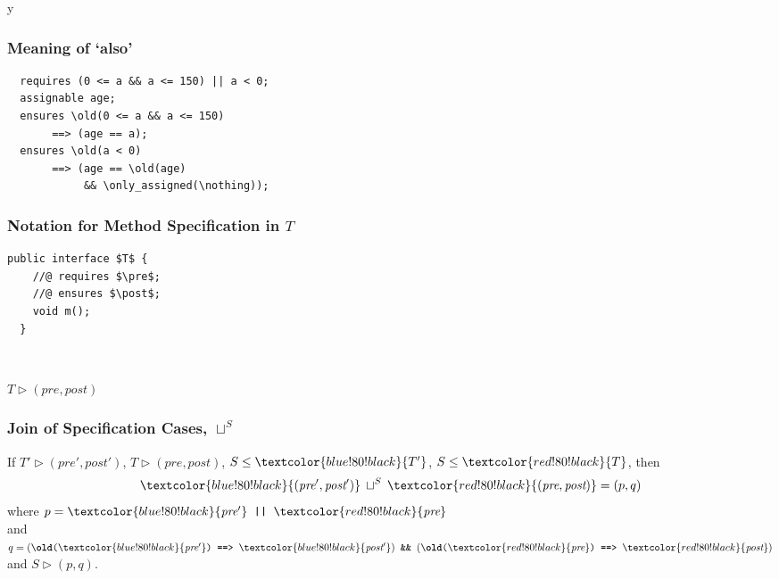 \if y\MAKEHANDOUTS \documentclass[t,compress,landscape,handout]{beamer}
\newcommand{\STO}{\ensuremath{\leq}}
\newcommand{\RED}[1]{\textcolor{red!80!black}{#1}}
\newcommand{\BLUE}[1]{\textcolor{blue!80!black}{#1}}
\newcommand{\pre}{{\textit{pre}}}
\newcommand{\post}{{\textit{post}}}
\newcommand{\join}{\ensuremath{\sqcup}}
\newcommand{\At}{\triangleright}
\begin{document}
\begin{frame}[fragile]
\frametitle{Meaning of `also'}

\begin{lstlisting}
  requires (0 <= a && a <= 150) || a < 0;
  assignable age;
  ensures \old(0 <= a && a <= 150)
       ==> (age == a);
  ensures \old(a < 0)
       ==> (age == \old(age)
            && \only_assigned(\nothing));
\end{lstlisting}
\end{frame}

\begin{frame}[fragile]
\frametitle{Notation for Method Specification in $T$}

\begin{lstlisting}[mathescape=true]
  public interface $T$ {
    //@ requires $\pre$;
    //@ ensures $\post$;
    void m();
  }
\end{lstlisting}

~

$T \At (\pre, \post)$
\end{frame}


\begin{frame}
\frametitle{Join of Specification Cases, $\join^{S}$}
\begin{definition}
If \BLUE{${T' \At (\pre',\post')}$}, \RED{$T \At (\pre, \post)$},
$S \STO \BLUE{T'}$, $S \STO \RED{T}$, 
then
\begin{displaymath}
\BLUE{(\pre',\post')} \:\join^S\: \RED{(\pre,\post)} = (p,q)
\end{displaymath}
where $p = \BLUE{\pre'} \mbox{\texttt{ || }} \RED{\pre}$ \\
and $q = (\texttt{\textbackslash\textbf{old}(}\BLUE{\pre'}\texttt{)}
   \mbox{\texttt{ ==> }} \BLUE{\post'})
\mbox{\texttt{ \&\& }}
  (\texttt{\textbackslash\textbf{old}(}\RED{\pre}\texttt{)}
   \mbox{\texttt{ ==> }} \RED{\post})$ \\
and $S \At (p, q)$.
\end{definition}
\end{frame}
\end{document}
